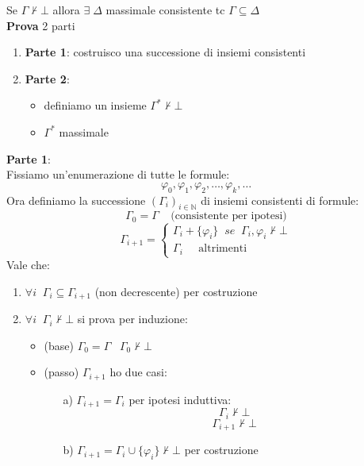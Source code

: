 \documentclass{article}
\theoremstyle{break}
\theoremstyle{break}
\theoremstyle{break}
\theoremstyle{break}
\begin{document}
Se \( \Gamma \not\vdash \bot \) allora \( \exists \; \Delta \) massimale consistente tc
\( \Gamma \subseteq \Delta \)\\
\textbf{Prova} 2 parti
\begin{enumerate}
  \item \textbf{Parte 1}: costruisco una successione di insiemi consistenti
  \item \textbf{Parte 2}: 
    \begin{itemize}
      \item definiamo un insieme \( \Gamma^* \not\vdash \bot \)
        \item \( \Gamma^* \) massimale 
    \end{itemize}
\end{enumerate}
\textbf{Parte 1}:\\
Fissiamo un'enumerazione di tutte le formule:
\[
\varphi_0, \varphi_1, \varphi_2, \ldots, \varphi_k, \ldots
\] 
Ora definiamo la successione \( (\Gamma_i)_{i \in \mathbb{N}} \) di insiemi consistenti di formule:
\[
\Gamma_0 = \Gamma\;\;\;\; \text{(consistente per ipotesi)}
\] 
\[
  \Gamma_{i+1} = \begin{cases}
    \Gamma_i + \{\varphi_i\}\;\;se\;\; \Gamma_i,\varphi_i \not\vdash \bot \\
    \Gamma_i\;\;\;\;\; \text{altrimenti}
  \end{cases}
\]  
Vale che:
\begin{enumerate}
  \item \( \forall i \;\; \Gamma_i \subseteq \Gamma_{i+1} \) (non decrescente) per costruzione
  \item \( \forall i\;\; \Gamma_i \not\vdash \bot \) si prova per induzione:
    \begin{itemize}
      \item (base) \( \Gamma_0 = \Gamma \;\;\; \Gamma_0 \not\vdash \bot \) 
      \item (passo) \( \Gamma_{i+1} \) ho due casi:
        \begin{enumerate}
          \item[a)] \( \Gamma_{i+1} = \Gamma_i \) per ipotesi induttiva:
            \[ \Gamma_i \not\vdash \bot \]
            \[
              \Gamma_{i+1} \not\vdash \bot
            \] 
        \item[b)] \( \Gamma_{i+1} = \Gamma_i \cup \{\varphi_i\} \not\vdash \bot \) per costruzione
        \end{enumerate}
    \end{itemize}
\end{enumerate}
\end{document}
